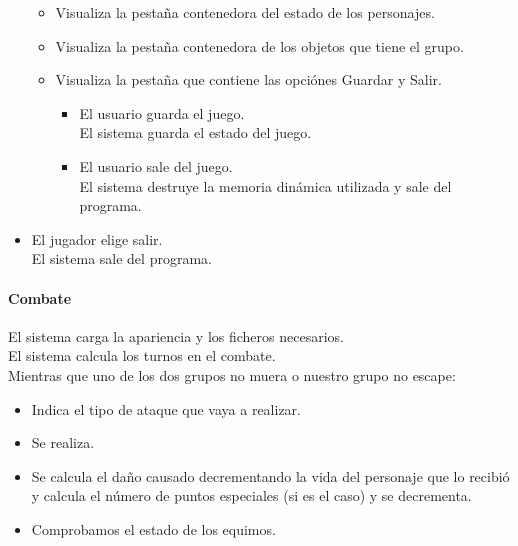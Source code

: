 \documentclass[a4paper,10pt]{article}
\begin{document}
\begin{itemize}
\begin{itemize}
\item Visualiza la pestaña contenedora del estado de los personajes.
\item Visualiza la pestaña contenedora de los objetos que tiene el grupo.
\item Visualiza la pestaña que contiene las opciónes Guardar y Salir.

\begin{itemize}
\item El usuario guarda el juego. \\ El sistema guarda el estado del juego.
\item El usuario sale del juego. \\ El sistema destruye la memoria dinámica utilizada y
  sale del programa.

\end{itemize}
\end{itemize}

\item El jugador elige salir. \\ El sistema sale del programa.
\end{itemize}

\clearpage

\paragraph*{Combate}
\noindent El sistema carga la apariencia y los ficheros necesarios. \\
El sistema calcula los turnos en el combate. \\
Mientras que uno de los dos grupos no muera o nuestro grupo no escape:

\begin{itemize}
\item Indica el tipo de ataque que vaya a realizar.
\item Se realiza.
\item Se calcula el daño causado decrementando la vida del personaje que lo recibió y
  calcula el número de puntos especiales (si es el caso) y se decrementa.
\item Comprobamos el estado de los equimos.
\end{itemize}
\end{document}
